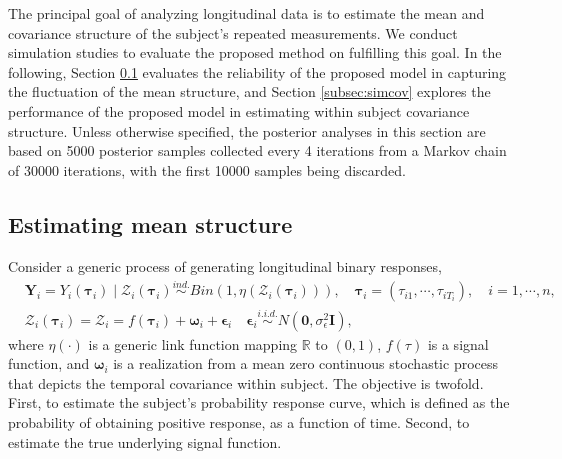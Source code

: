 The principal goal of analyzing longitudinal data is to estimate the mean and covariance structure of the subject's repeated measurements. We conduct simulation studies to evaluate the proposed method on fulfilling this goal. In the following, Section \ref{subsec:simmean} evaluates the
reliability of the proposed model in capturing the fluctuation of the mean structure, and Section \ref{subsec:simcov} explores the performance of the proposed model in estimating within subject covariance structure. 
Unless otherwise specified, the posterior analyses in this section are based on 5000 posterior samples collected every 4 iterations from a Markov chain of 30000 iterations, with the first 10000 samples being discarded. 



 
\subsection{Estimating mean structure}
\label{subsec:simmean}

Consider a generic process of generating longitudinal binary responses,
\begin{equation}
\begin{split}
&
\mathbf{Y}_i = Y_i(\boldsymbol{\tau}_{i}) \mid \mathcal{Z}_i(\boldsymbol{\tau}_{i}) 
\stackrel{ind.}{\sim} Bin(1,\eta(\mathcal{Z}_i(\boldsymbol{\tau}_{i}))), 
\quad \boldsymbol{\tau}_i=(\tau_{i1},\cdots,\tau_{iT_i}),\quad i=1,\cdots,n,\\
& 
\mathcal{Z}_i(\boldsymbol{\tau}_{i}) =\boldsymbol{\mathcal{Z}}_i
=f(\boldsymbol{\tau}_i)+\boldsymbol{\omega}_i+\boldsymbol{\epsilon}_i
\quad \boldsymbol{\epsilon}_i\stackrel{i.i.d.}{\sim} N(\mathbf{0},\sigma_{\epsilon}^2\mathbf{I}),
    \end{split}    
    \label{eq:datagensim}
\end{equation}
where $\eta(\cdot)$ is a generic link function mapping $\mathbb{R}$ to $(0,1)$, $f(\tau)$ is a signal function, and 
$\boldsymbol{\omega}_i$ is a realization from a mean zero continuous stochastic process that depicts the temporal covariance within subject. The objective is twofold. First, to estimate the subject's probability response curve, which is defined as the probability of obtaining positive response, as a function of time. Second, to estimate the true underlying signal function. 

